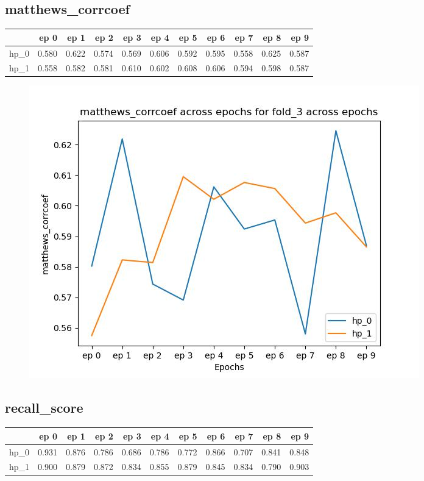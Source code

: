 \documentclass{article}
\begin{document}
\subsection{matthews\_corrcoef}
\begin{tabular}{lrrrrrrrrrr}
\toprule
{} &   ep 0 &   ep 1 &   ep 2 &   ep 3 &   ep 4 &   ep 5 &   ep 6 &   ep 7 &   ep 8 &   ep 9 \\
\midrule
hp\_0 &  0.580 &  0.622 &  0.574 &  0.569 &  0.606 &  0.592 &  0.595 &  0.558 &  0.625 &  0.587 \\
hp\_1 &  0.558 &  0.582 &  0.581 &  0.610 &  0.602 &  0.608 &  0.606 &  0.594 &  0.598 &  0.587 \\
\bottomrule
\end{tabular}

\begin{figure}[H]
\includegraphics[scale = 0.75]{fold_3/matthews_corrcoef}
\end{figure}
\subsection{recall\_score}
\begin{tabular}{lrrrrrrrrrr}
\toprule
{} &   ep 0 &   ep 1 &   ep 2 &   ep 3 &   ep 4 &   ep 5 &   ep 6 &   ep 7 &   ep 8 &   ep 9 \\
\midrule
hp\_0 &  0.931 &  0.876 &  0.786 &  0.686 &  0.786 &  0.772 &  0.866 &  0.707 &  0.841 &  0.848 \\
hp\_1 &  0.900 &  0.879 &  0.872 &  0.834 &  0.855 &  0.879 &  0.845 &  0.834 &  0.790 &  0.903 \\
\bottomrule
\end{tabular}
\end{document}
